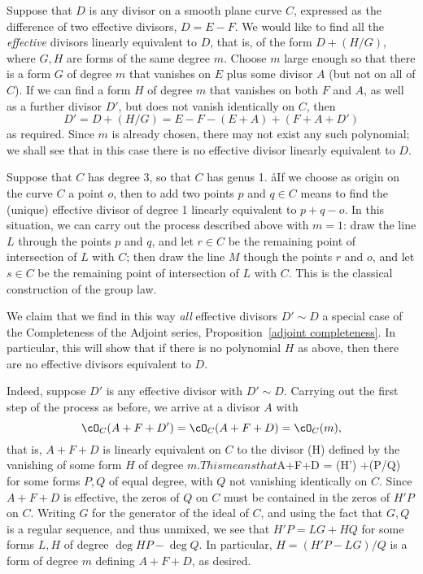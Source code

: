 Suppose that $D$ is any divisor on a smooth plane curve $C$, expressed as the difference of
two effective divisors, $D= E-F$. We would like to find all the \emph{effective} divisors linearly equivalent to $D$, that is, of the form
$D + (H/G)$, where $G, H$ are forms of the same degree $m$. Choose $m$ large enough so that
there is
 a form $G$ of degree $m$ that vanishes on $E$ plus some divisor $A$ (but not on all of $C$). If we can find a form $H$ of degree $m$ that vanishes on both $F$ and $A$, as well as a further divisor $D'$, but does not vanish identically on $C$, then
$$
D' = D + (H/G) = E- F - (E+A)+(F+A+D')
$$
as required. Since $m$ is already chosen, there may not exist any such polynomial; we shall see that in this case there is no effective divisor linearly equivalent to $D$. 

\begin{example}
Suppose that $C$ has degree 3, so that $C$ has genus 1. åIf we choose as origin on the curve $C$ a point $o$, then to add two points $p$ and $q \in C$ means to find the (unique) effective divisor of degree 1 linearly equivalent to $p + q - o$. In this situation, we can carry out the process described above with $m=1$: draw the line $L$ through the points $p$ and $q$, and let $r \in C$ be the remaining point of intersection of $L$ with $C$; then draw the line $M$ though the points $r$ and $o$, and let $s \in C$ be the remaining point of intersection of $L$ with $C$. This is the classical construction of the group law.
\end{example}

We claim that we find in this way \emph{all} effective divisors $D' \sim D$ a special case of the Completeness of the Adjoint series, Proposition~\ref{adjoint completeness}. In particular, this will show that if there is no polynomial $H$ as above, then there are no effective divisors equivalent to $D$.

Indeed, suppose $D'$ is any effective divisor with $D' \sim D$. Carrying out the first step of the process as before, we arrive at a divisor $A$ with 
$$
\cO_C(A+F+D') = \cO_C(A+F+D)  = \cO_C(m),
$$
that is, $A+F+D$ is linearly equivalent on $C$ to the divisor (H) defined by the vanishing of some form $H$ of degree $m. This means that
$A+F+D  = (H') +(P/Q) for some forms $P,Q$ of equal degree, with $Q$ not vanishing identically on $C$. Since $A+F+D$ is effective,
the zeros of $Q$ on $C$ must be contained in the zeros of $H'P$ on $C$. Writing
$G$ for the generator of the ideal of $C$, and using the fact that
$G,Q$ is a regular sequence, and thus unmixed, we see that $H'P = LG+HQ$ for some
forms $L,H$ of degree $\deg HP - \deg Q$. In particular, $H = (H'P- LG)/Q$ is a form
of degree $m$ defining $A+F+D$, as desired.

